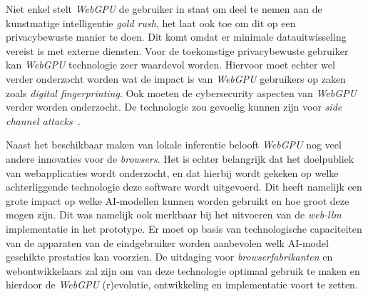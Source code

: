 \bigbreak{}

Niet enkel stelt \textit{WebGPU} de gebruiker in staat om deel te nemen aan de kunstmatige intelligentie \textit{gold rush}, het laat ook toe om dit op een privacybewuste manier te doen. Dit komt omdat er minimale datauitwisseling vereist is met externe diensten. Voor de toekomstige privacybewuste gebruiker kan \textit{WebGPU} technologie zeer waardevol worden. Hiervoor moet echter wel verder onderzocht worden wat de impact is van \textit{WebGPU} gebruikers op zaken zoals \textit{digital fingerprinting}. Ook moeten de cybersecurity aspecten van \textit{WebGPU} verder worden onderzocht. De technologie zou gevoelig kunnen zijn voor \textit{side channel attacks}~\autocite{Giner2024}.

\bigbreak{}

Naast het beschikbaar maken van lokale inferentie belooft \textit{WebGPU} nog veel andere innovaties voor de \textit{browsers}. Het is echter belangrijk dat het doelpubliek van webapplicaties wordt onderzocht, en dat hierbij wordt gekeken op welke achterliggende technologie deze software wordt uitgevoerd. Dit heeft namelijk een grote impact op welke AI-modellen kunnen worden gebruikt en hoe groot deze mogen zijn. Dit was namelijk ook merkbaar bij het uitvoeren van de \textit{web-llm} implementatie in het prototype. Er moet op basis van technologische capaciteiten van de apparaten van de eindgebruiker worden aanbevolen welk AI-model geschikte prestaties kan voorzien. De uitdaging voor \textit{browserfabrikanten} en web\-on\-twi\-kke\-laars zal zijn om van deze technologie optimaal gebruik te maken en hierdoor de \textit{WebGPU} (r)evolutie, ontwikkeling en implementatie voort te zetten.